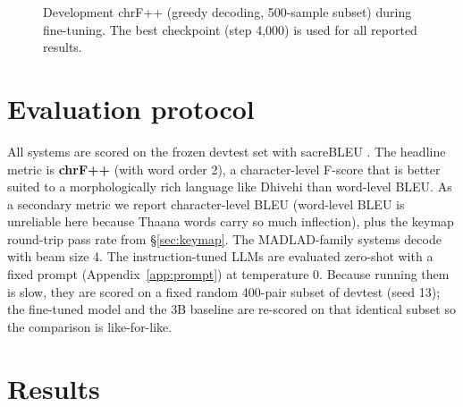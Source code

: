 \documentclass[10pt,twocolumn]{article}
\begin{document}
\begin{figure}[t]
\centering
{}
\caption{Development chrF++ (greedy decoding, 500-sample subset) during
fine-tuning. The best checkpoint (step 4{,}000) is used for all reported
results.}
\label{fig:curve}
\end{figure}

\section{Evaluation protocol}

All systems are scored on the frozen devtest set with sacreBLEU
\citep{sacrebleu}. The headline metric is \textbf{chrF++} \citep{chrfpp}
(with word order 2), a character-level F-score that is better suited to a
morphologically rich language like Dhivehi than word-level BLEU. As a
secondary metric we report character-level BLEU (word-level BLEU is
unreliable here because Thaana words carry so much inflection), plus the
keymap round-trip pass rate from \S\ref{sec:keymap}. The MADLAD-family
systems decode with beam size 4. The instruction-tuned LLMs are evaluated
zero-shot with a fixed prompt (Appendix~\ref{app:prompt}) at temperature
0. Because running them is slow, they are scored on a fixed random
400-pair subset of devtest (seed 13); the fine-tuned model and the 3B
baseline are re-scored on that identical subset so the comparison is
like-for-like.

\section{Results}
\label{sec:results}
\end{document}
